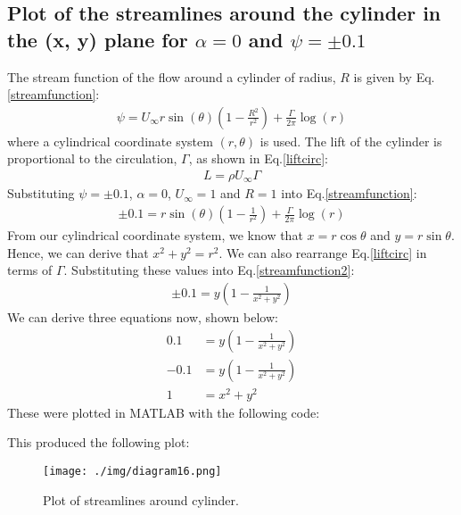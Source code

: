 \subsection{Plot of the streamlines around the cylinder in the (x, y) plane for $\alpha = 0$ and $\psi = \pm 0.1$}
The stream function of the flow around a cylinder of radius, $R$ is given by Eq.\ref{streamfunction}:
\begin{align}
    \psi = U_{\infty}r\sin\left(\theta\right) \left(1 - \frac{R^2}{r^2}\right) + \frac{\Gamma}{2\pi}\log\left(r\right)\label{streamfunction}
\end{align}
where a cylindrical coordinate system $(r,\theta)$ is used.
The lift of the cylinder is proportional to the circulation, $\Gamma$, as shown in Eq.\ref{liftcirc}:
\begin{align}
    L = \rho U_{\infty} \Gamma \label{liftcirc}
\end{align}
Substituting $\psi = \pm 0.1$, $\alpha = 0$, $U_{\infty} = 1$ and $R=1$ into Eq.\ref{streamfunction}:
\begin{align}
    \pm 0.1 = r\sin\left(\theta\right) \left(1-\frac{1}{r^2}\right) + \frac{\Gamma}{2\pi} \log\left(r\right) \label{streamfunction2}
\end{align}
From our cylindrical coordinate system, we know that $x=r\cos\theta$ and $y = r\sin\theta$. Hence, we can derive that $x^2 + y^2 = r^2$. We can also rearrange Eq.\ref{liftcirc} in terms of $\Gamma$. Substituting these values into Eq.\ref{streamfunction2}:
\begin{align}
    \pm 0.1 = y\left(1-\frac{1}{x^2 + y^2}\right)\label{streamfunction3}
\end{align}
We can derive three equations now, shown below:
\begin{align}
    0.1  & = y\left(1-\frac{1}{x^2 + y^2}\right) \\
    -0.1 & = y\left(1-\frac{1}{x^2 + y^2}\right) \\
    1    & = x^2 + y^2
\end{align}
These were plotted in MATLAB with the following code:

This produced the following plot:
\begin{figure}[H]
    \centering
    \texttt{[image: ./img/diagram16.png]}
    \caption{Plot of streamlines around cylinder.}
\end{figure}
